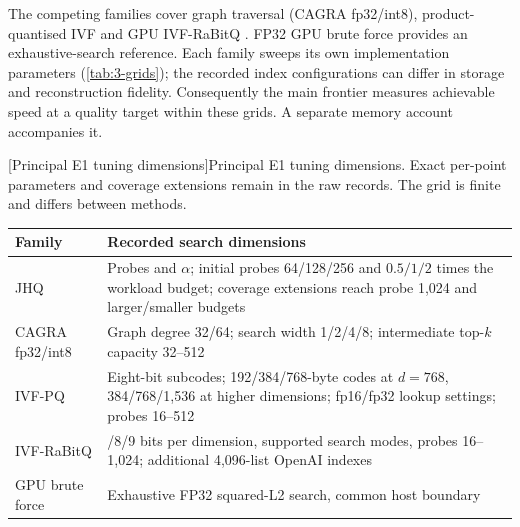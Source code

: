 The competing families cover graph traversal (CAGRA fp32/int8),
product-quantised IVF and GPU IVF-RaBitQ \cite{cagra,pq,ivfrabitq}.
FP32 GPU brute force provides an exhaustive-search reference. Each family
sweeps its own implementation parameters (\cref{tab:3-grids}); the recorded
index configurations can differ in storage and reconstruction fidelity.
Consequently the main frontier measures achievable speed at a quality
target within these grids. A separate memory account accompanies it.

\par\medskip\noindent\begin{minipage}{\linewidth}
\centering\captionsetup{hypcap=false}
[Principal E1 tuning dimensions]{Principal E1 tuning dimensions. Exact per-point parameters and
coverage extensions remain in the raw records. The grid is finite and
differs between methods.}
\label{tab:3-grids}
\footnotesize\setlength{\tabcolsep}{4pt}
\begin{tabularx}{\linewidth}{@{}>{\raggedright\arraybackslash}p{.22\linewidth}>{\raggedright\arraybackslash}X@{}}
\toprule
Family & Recorded search dimensions \\
\midrule
JHQ & Probes and $\alpha$; initial probes 64/128/256 and
$0.5/1/2$ times the workload budget; coverage extensions reach probe
1,024 and larger/smaller budgets \\
CAGRA fp32/int8 & Graph degree 32/64; search width 1/2/4/8;
intermediate top-$k$ capacity 32--512 \\
IVF-PQ & Eight-bit subcodes; 192/384/768-byte codes at $d=768$,
384/768/1,536 at higher dimensions; fp16/fp32 lookup settings;
probes 16--512 \\
IVF-RaBitQ & 4/8/9 bits per dimension, supported search modes,
probes 16--1,024; additional 4,096-list OpenAI indexes \\
GPU brute force & Exhaustive FP32 squared-L2 search, common host boundary \\
\bottomrule
\end{tabularx}
\end{minipage}\par\medskip

